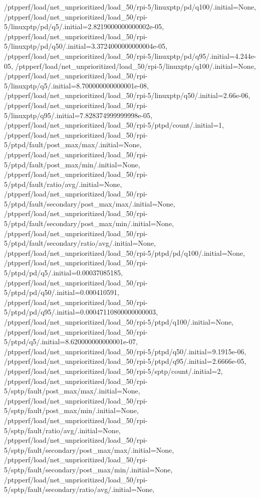 {    /ptpperf/load/net_unprioritized/load_50/rpi-5/linuxptp/pd/q100/.initial=None,
    /ptpperf/load/net_unprioritized/load_50/rpi-5/linuxptp/pd/q5/.initial=2.8219000000000002e-05,
    /ptpperf/load/net_unprioritized/load_50/rpi-5/linuxptp/pd/q50/.initial=3.3724000000000004e-05,
    /ptpperf/load/net_unprioritized/load_50/rpi-5/linuxptp/pd/q95/.initial=4.244e-05,
    /ptpperf/load/net_unprioritized/load_50/rpi-5/linuxptp/q100/.initial=None,
    /ptpperf/load/net_unprioritized/load_50/rpi-5/linuxptp/q5/.initial=8.700000000000001e-08,
    /ptpperf/load/net_unprioritized/load_50/rpi-5/linuxptp/q50/.initial=2.66e-06,
    /ptpperf/load/net_unprioritized/load_50/rpi-5/linuxptp/q95/.initial=7.828374999999998e-05,
    /ptpperf/load/net_unprioritized/load_50/rpi-5/ptpd/count/.initial=1,
    /ptpperf/load/net_unprioritized/load_50/rpi-5/ptpd/fault/post_max/max/.initial=None,
    /ptpperf/load/net_unprioritized/load_50/rpi-5/ptpd/fault/post_max/min/.initial=None,
    /ptpperf/load/net_unprioritized/load_50/rpi-5/ptpd/fault/ratio/avg/.initial=None,
    /ptpperf/load/net_unprioritized/load_50/rpi-5/ptpd/fault/secondary/post_max/max/.initial=None,
    /ptpperf/load/net_unprioritized/load_50/rpi-5/ptpd/fault/secondary/post_max/min/.initial=None,
    /ptpperf/load/net_unprioritized/load_50/rpi-5/ptpd/fault/secondary/ratio/avg/.initial=None,
    /ptpperf/load/net_unprioritized/load_50/rpi-5/ptpd/pd/q100/.initial=None,
    /ptpperf/load/net_unprioritized/load_50/rpi-5/ptpd/pd/q5/.initial=0.00037085185,
    /ptpperf/load/net_unprioritized/load_50/rpi-5/ptpd/pd/q50/.initial=0.000410591,
    /ptpperf/load/net_unprioritized/load_50/rpi-5/ptpd/pd/q95/.initial=0.00047110800000000003,
    /ptpperf/load/net_unprioritized/load_50/rpi-5/ptpd/q100/.initial=None,
    /ptpperf/load/net_unprioritized/load_50/rpi-5/ptpd/q5/.initial=8.620000000000001e-07,
    /ptpperf/load/net_unprioritized/load_50/rpi-5/ptpd/q50/.initial=9.1915e-06,
    /ptpperf/load/net_unprioritized/load_50/rpi-5/ptpd/q95/.initial=2.6666e-05,
    /ptpperf/load/net_unprioritized/load_50/rpi-5/sptp/count/.initial=2,
    /ptpperf/load/net_unprioritized/load_50/rpi-5/sptp/fault/post_max/max/.initial=None,
    /ptpperf/load/net_unprioritized/load_50/rpi-5/sptp/fault/post_max/min/.initial=None,
    /ptpperf/load/net_unprioritized/load_50/rpi-5/sptp/fault/ratio/avg/.initial=None,
    /ptpperf/load/net_unprioritized/load_50/rpi-5/sptp/fault/secondary/post_max/max/.initial=None,
    /ptpperf/load/net_unprioritized/load_50/rpi-5/sptp/fault/secondary/post_max/min/.initial=None,
    /ptpperf/load/net_unprioritized/load_50/rpi-5/sptp/fault/secondary/ratio/avg/.initial=None,
}
